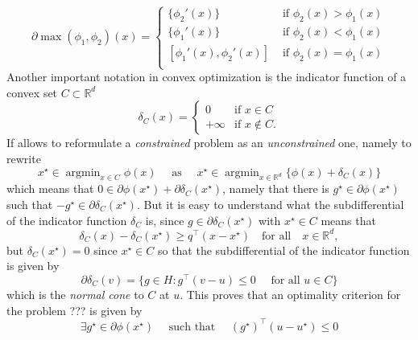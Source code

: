 \documentclass[
	fontsize=11pt, %
	twoside=false, %
	numbers=noenddot, %
]{kaobook}
\DeclareMathOperator*{\argmin}{argmin}
\newcommand{\R}{\mathbb R}
\begin{document}
\begin{equation*}
	\partial \max(\phi_1, \phi_2)(x) = 
	\begin{cases}
	\{ \phi_2'(x) \} &\text{ if } \phi_2(x) > \phi_1(x) \\
	\{ \phi_1'(x) \} &\text{ if } \phi_2(x) < \phi_1(x) \\
	[ \phi_1'(x), \phi_2'(x) ] &\text{ if } \phi_2(x) = \phi_1(x) \\
	\end{cases}
\end{equation*}
Another important notation in convex optimization is the indicator function of a convex set $C \subset \R^d$
\begin{equation*}
	\delta_C(x) = \begin{cases}
		0 &\text{if } x \in C \\
		+\infty &\text{if } x \notin C.
	\end{cases}
\end{equation*}
If allows to reformulate a \emph{constrained} problem as an \emph{unconstrained} one, namely to rewrite
\begin{equation*}
	x^\star \in \argmin_{x \in C} \phi(x) \quad \text{ as } \quad x^\star \in \argmin_{x \in \R^d} \{ \phi(x) + \delta_C(x) \} 
\end{equation*}
which means that $0 \in \partial \phi(x^\star) + \partial \delta_C(x^\star)$, namely that there is $g^\star \in \partial \phi(x^\star)$ such that $-g^\star \in \partial \delta_C(x^\star)$.
But it is easy to understand what the subdifferential of the indicator function $\delta_C$ is, since $g \in \partial \delta_C(x^\star)$ with $x^\star \in C$ means%
that
\begin{equation*}
	\delta_C(x) - \delta_C(x^\star) \geq q^\top (x - x^\star) \quad \text{for all} \quad x \in \R^d,
\end{equation*}
but $\delta_C(x^\star) = 0$ since $x^\star \in C$ so that the subdifferential of the indicator function is given by
\begin{equation*}
	\partial \delta_C(v) = \{ g \in H : g^\top (v - u) \leq 0 \quad 
	\text{ for all } u \in C\}
\end{equation*}
which is the \emph{normal cone} to $C$ at $u$.
This proves that an optimality criterion for the problem ??? is given by
\begin{equation*}
	\exists g^\star \in \partial \phi(x^\star) \quad \text{ such that } \quad (g^\star)^\top (u - u^\star) \leq 0
\end{equation*}
\end{document}

